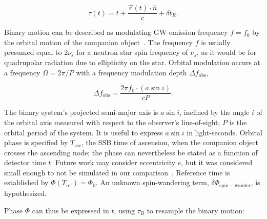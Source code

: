 \documentclass[12pt]{iopart}
\begin{document}

\begin{equation}
\tau(t) 
 = t + \frac{\vec{r}(t) \cdot \hat{n}}{c} + \delta t_R.
\label{barycentering_time_domain}
\end{equation}

Binary motion can be described as modulating GW emission frequency $f=f_0$ by the orbital motion of the companion object~\cite{GoetzTwoSpectResults2014}.
The frequency $f$ is usually presumed equal to $2\nu_s$ for a neutron star spin frequency of $\nu_s$, as it would be for quadrupolar radiation due to ellipticity on the star.
Orbital modulation occurs at a frequency $\Omega = 2\pi/P$ with a frequency modulation depth $\Delta f_\mathrm{obs}$,

\begin{equation}
\Delta f_\mathrm{obs} = \frac{2 \pi f_0 \cdot (a \sin i)}{cP}.
\label{TwoSpect_mod_depth}
\end{equation}

\noindent The binary system's projected semi-major axis is $a \sin i$, inclined by the angle $i$ of the orbital axis measured with respect to the observer's line-of-sight; $P$ is the orbital period of the system.
It is useful to express $a \sin i$ in light-seconds.
Orbital phase is specified by $T_\mathrm{asc}$, the SSB time of ascension, when the companion object crosses the ascending node; the phase can nevertheless be stated as a function of detector time $t$.
Future work may consider eccentricity $e$, but it was considered small enough to not be simulated in our comparison~\cite{ScoX1MDC2015PRD}.
Reference time is established by $\Phi(T_\mathrm{ref}) = \Phi_0$.
An unknown spin-wandering term, $\delta \Phi_\mathrm{spin-wander}$, is hypothesized.

Phase $\Phi$ can thus be expressed in $t$, using $\tau_B$ to resample the binary motion: 
\end{document}
